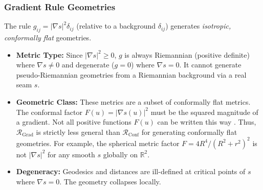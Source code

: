 \documentclass[twoside,twocolumn]{article}
\begin{document}
\subsubsection{Gradient Rule Geometries}
The rule \( g_{ij} = |\nabla s|^2 \delta_{ij} \) (relative to a background \( \delta_{ij} \)) generates \emph{isotropic, conformally flat} geometries.
\begin{itemize}
    \item \textbf{Metric Type:} Since \( |\nabla s|^2 \ge 0 \), \( g \) is always Riemannian (positive definite) where \( \nabla s \neq 0 \) and degenerate (\( g=0 \)) where \( \nabla s = 0 \). It cannot generate pseudo-Riemannian geometries from a Riemannian background via a real seam \( s \).
    \item \textbf{Geometric Class:} These metrics are a subset of conformally flat metrics. The conformal factor \( F(u) = |\nabla s(u)|^2 \) must be the squared magnitude of a gradient. Not all positive functions \( F(u) \) can be written this way \cite{Sethian1999}. %
    Thus, \( \mathcal{R}_{\text{Grad}} \) is strictly less general than \( \mathcal{R}_{\text{Conf}} \) for generating conformally flat geometries. For example, the spherical metric factor \( F=4R^4/(R^2+r^2)^2 \) is not \( |\nabla s|^2 \) for any smooth \( s \) globally on \( \mathbb{R}^2 \).
    \item \textbf{Degeneracy:} Geodesics and distances are ill-defined at critical points of \( s \) where \( \nabla s = 0 \). The geometry collapses locally.
\end{itemize}
\end{document}
